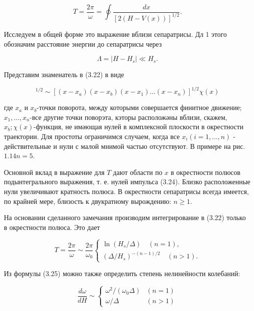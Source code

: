 \documentclass[10pt]{article}
\begin{document}
\begin{equation*}
T=\frac{2 \pi}{\omega}=\oint \frac{d x}{[2(H-V(x))]^{1 / 2}} . \tag{3.22}
\end{equation*}


Исследуем в общей форме это выражение вблизи сепаратрисы. Дл 1 этого обозначим расстояние энергии до сепаратрисы через


\begin{equation*}
\Lambda=\left|H-H_{s}\right| \ll H_{s} . \tag{3.23}
\end{equation*}


Представим знаменатель в (3.22) в виде


\begin{equation*}
[2(H-V(x))]^{1 / 2} \sim\left[\left(x-x_{a}\right)\left(x-x_{b}\right)\left(x-x_{1}\right) \ldots\left(x-x_{n}\right)\right]^{1 / 2} \chi(x) \tag{3.24}
\end{equation*}


где $x_{a}$ и $x_{b}$-точки поворота, между которыми совершается финитное движение; $x_{1}, \ldots, x_{n}$-все другие точки поворэта, кэторы расположәны вблизи, скажем, $x_{b} ; \chi(x)$-функция, не имәющая нулей в комплексной плоскости в окрестности траектории. Для простоты ограничимся случаем, когда все $x_{i}(i=1, \ldots, n)$ - действительные и нули с малой мнимой частью отсутствуют. В примере на рис. $1.14 n=5$.

Основной вклад в выражение для $T$ дают области по $x$ в окрестности полюсов подынтегрального выражения, т. е. нулей импульса (3.24). Близко расположенные нули увеличивают кратность полюса. В окрестности сепаратрисы всегда имеется, по крайней мере, близость к двукратному вырождению: $n \geqslant 1$.

На основании сделанного замечания производим интегрирование в (3.22) только в окрестности полюса. Это дает

\[
T=\frac{2 \pi}{\omega} \sim \frac{2 \pi}{\omega_{0}}\left\{\begin{array}{l}
\ln \left(H_{s} / \Delta\right) \quad(n=1),  \tag{3.25}\\
\left(\Delta / H_{s}\right)^{-(n-1) / 2} \quad(n>1) .
\end{array}\right.
\]

Из формулы (3.25) можно также определить степень нелинейности колебаний:

\[
\frac{d \omega}{d H} \sim \begin{cases}\omega^{2} /\left(\omega_{0} \Delta\right) & (n=1)  \tag{3.26}\\ \omega / \Delta & (n>1)\end{cases}
\]
\end{document}
